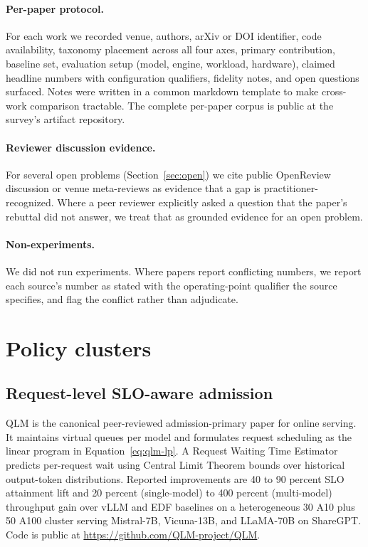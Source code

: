 \documentclass[10pt]{article} %
\theoremstyle{definition}
\begin{document}
\paragraph{Per-paper protocol.} For each work we recorded venue,
authors, arXiv or DOI identifier, code availability, taxonomy
placement across all four axes, primary contribution, baseline set,
evaluation setup (model, engine, workload, hardware), claimed headline
numbers with configuration qualifiers, fidelity notes, and open
questions surfaced. Notes were written in a common markdown template
to make cross-work comparison tractable. The complete per-paper corpus
is public at the survey's artifact repository.

\paragraph{Reviewer discussion evidence.} For several open problems
(Section~\ref{sec:open}) we cite public OpenReview discussion or venue
meta-reviews as evidence that a gap is practitioner-recognized. Where
a peer reviewer explicitly asked a question that the paper's rebuttal
did not answer, we treat that as grounded evidence for an open
problem.

\paragraph{Non-experiments.} We did not run experiments. Where papers
report conflicting numbers, we report each source's number as stated
with the operating-point qualifier the source specifies, and flag the
conflict rather than adjudicate.

\section{Policy clusters}
\label{sec:clusters}

\subsection{Request-level SLO-aware admission}

QLM \citep{patke2024qlm} is the canonical peer-reviewed
admission-primary paper for online serving. It maintains virtual
queues per model and formulates request scheduling as the linear
program in Equation~\ref{eq:qlm-lp}. A Request Waiting Time Estimator
predicts per-request wait using Central Limit Theorem bounds over
historical output-token distributions. Reported improvements are 40 to
90 percent SLO attainment lift and 20 percent (single-model) to 400
percent (multi-model) throughput gain over vLLM and EDF baselines on a
heterogeneous 30 A10 plus 50 A100 cluster serving Mistral-7B,
Vicuna-13B, and LLaMA-70B on ShareGPT. Code is public at
\url{https://github.com/QLM-project/QLM}.
\end{document}
